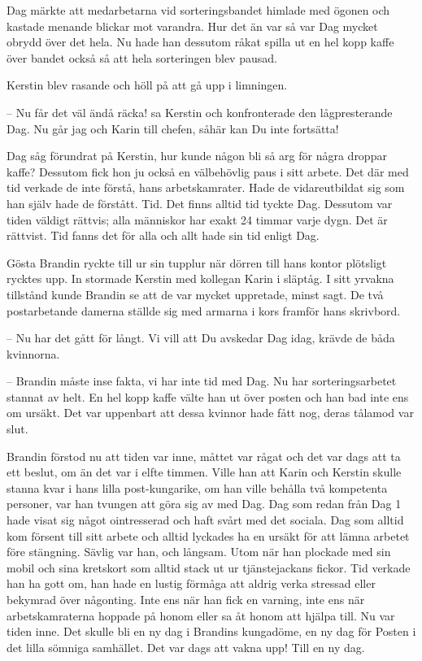 Dag märkte att medarbetarna vid sorteringsbandet himlade med ögonen och kastade menande blickar mot varandra. Hur det än var så var Dag mycket obrydd över det hela. Nu hade han dessutom råkat spilla ut en hel kopp kaffe över bandet också så att hela sorteringen blev pausad. 

Kerstin blev rasande och höll på att gå upp i limningen.

– Nu får det väl ändå räcka! sa Kerstin och konfronterade den lågpresterande Dag. Nu går jag och Karin till chefen, såhär kan Du inte fortsätta! 

Dag såg förundrat på Kerstin, hur kunde någon bli så arg för några droppar kaffe? Dessutom fick hon ju också en välbehövlig paus i sitt arbete. Det där med tid verkade de inte förstå, hans arbetskamrater. Hade de vidareutbildat sig som han själv hade de förstått. Tid. Det finns alltid tid tyckte Dag. Dessutom var tiden väldigt rättvis; alla människor har exakt 24 timmar varje dygn. Det är rättvist. Tid fanns det för alla och allt hade sin tid enligt Dag.

Gösta Brandin ryckte till ur sin tupplur när dörren till hans kontor plötsligt rycktes upp. In stormade Kerstin med kollegan Karin i släptåg. I sitt yrvakna tillstånd kunde Brandin se att de var mycket uppretade, minst sagt. De två postarbetande damerna ställde sig med armarna i kors framför hans skrivbord. 

– Nu har det gått för långt. Vi vill att Du avskedar Dag idag, krävde de båda kvinnorna.

– Brandin måste inse fakta, vi har inte tid med Dag. Nu har sorteringsarbetet stannat av helt. En hel kopp kaffe välte han ut över posten och han bad inte ens om ursäkt. Det var uppenbart att dessa kvinnor hade fått nog, deras tålamod var slut.

Brandin förstod nu att tiden var inne, måttet var rågat och det var dags att ta ett beslut, om än det var i elfte timmen. Ville han att Karin och Kerstin skulle stanna kvar i hans lilla post-kungarike, om han ville behålla två kompetenta personer, var han tvungen att göra sig av med Dag. Dag som redan från Dag 1 hade visat sig något ointresserad och haft svårt med det sociala. Dag som alltid kom försent till sitt arbete och alltid lyckades ha en ursäkt för att lämna arbetet före stängning. Sävlig var han, och långsam. Utom när han plockade med sin mobil och sina kretskort som alltid stack ut ur tjänstejackans fickor. Tid verkade han ha gott om, han hade en lustig förmåga att aldrig verka stressad eller bekymrad över någonting. Inte ens när han fick en varning, inte ens när arbetskamraterna hoppade på honom eller sa åt honom att hjälpa till. Nu var tiden inne. Det skulle bli en ny dag i Brandins kungadöme, en ny dag för Posten i det lilla sömniga samhället. Det var dags att vakna upp! Till en ny dag.

